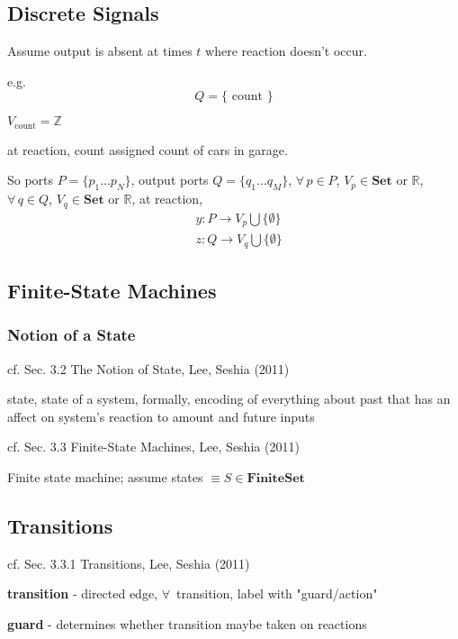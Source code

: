 \documentclass[10pt]{amsart}
\begin{document}
\begin{multicols*}{2}
\subsection{Discrete Signals}  

Assume output is absent at times $t$ where reaction doesn't occur.  

e.g. 
\[
Q = \lbrace \text{ count } \rbrace
\]

$V_{\text{count}} = \mathbb{Z}$  

at reaction, count assigned count of cars in garage.  

So ports $P=\lbrace p_1 \dots p_N \rbrace$, output ports $Q= \lbrace q_1 \dots q_M \rbrace$, $\forall \, p \in P$, $V_p \in \textbf{Set}$ or $\mathbb{R}$, $\forall \, q \in Q$, $V_q \in \textbf{Set}$ or $\mathbb{R}$, at reaction, 
\[
\begin{aligned}
& y: P \to V_p \bigcup \lbrace \emptyset \rbrace  \\ 
& z : Q \to V_q \bigcup \lbrace \emptyset \rbrace
\end{aligned}
\]

\subsection{Finite-State Machines}

\subsubsection{Notion of a State}  

cf. Sec. 3.2 The Notion of State, Lee, Seshia (2011) \cite{LeSe2011}

state, state of a system, formally, encoding of everything about past that has an affect on system's reaction to amount and future inputs  

cf. Sec. 3.3 Finite-State Machines, Lee, Seshia (2011) \cite{LeSe2011}  

Finite state machine; assume states $\equiv S \in \textbf{FiniteSet}$  

\subsection{Transitions}

cf. Sec. 3.3.1 Transitions, Lee, Seshia (2011) \cite{LeSe2011}

\textbf{transition} - directed edge, $\forall \, $ transition, label with "guard/action"  

\textbf{guard} - determines whether transition maybe taken on reactions  


\end{multicols*}
\end{document}
